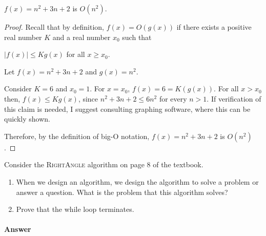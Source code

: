 \documentclass{article}
\begin{document}

\begin{theorem}
	$f(x)=n^2 + 3n +2$ is $O(n^2)$.
\end{theorem}
\begin{proof}
	Recall that by definition, $f(x) = O(g(x))$ if there exists a positive real number $K$ and a real number $x_0$
	such that

	$|f(x)|\leq K g(x)$ for all $x \geq x_0$.

	Let $f(x)=n^2 + 3n + 2$ and $g(x) = n^2$.

	Consider $K=6$ and $x_0=1$. For $x=x_0$, $f(x)=6=K(g(x))$. For all $x > x_0$ then, $f(x) \leq K g(x)$, 
	since $n^2 + 3n + 2 \leq 6n^2$ for every $n>1$. If verification of this claim is needed, I suggest
	consulting graphing software, where this can be quickly shown.

	Therefore, by the definition of big-O notation, $f(x)=n^2 + 3n + 2$ is $O(n^2)$.

\end{proof}




\nextprob
Consider the \textsc{RightAngle} algorithm on page 8 of the textbook.
\begin{enumerate}
    \item When we design an algorithm, we design the algorithm to solve a
        problem or answer a question.  What is the problem that this algorithm
        solves?
    \item Prove that the while loop terminates.
\end{enumerate}

\paragraph{Answer}

\end{document}
